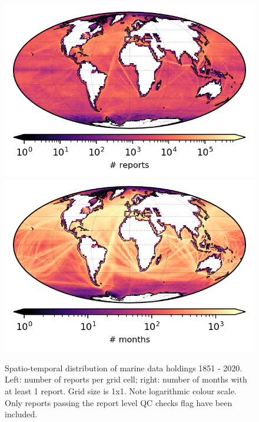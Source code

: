 \begin{figure}[h]
\includegraphics{resources/header-reports-map-optimal.png}
\includegraphics{resources/header-months-map-optimal.png}
\caption{Spatio-temporal distribution of marine data holdings 1851 - 2020. Left: number of reports per grid cell; right: number of months with at least 1 report. Grid size is 1x1. Note logarithmic colour scale. Only reports passing the report level QC checks flag have been included.}
\label{fig:nreports-map1}
\end{figure}

\newpage

